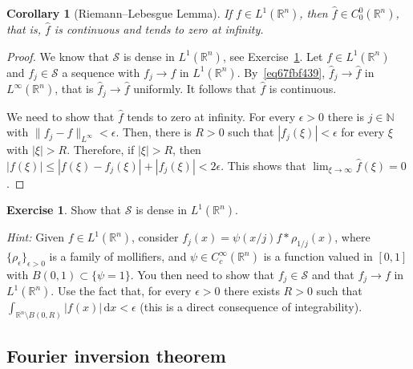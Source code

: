 \documentclass[a4paper,9pt]{amsart}
\newcommand{\scr}[1]{\mathscr{#1}}
\newcommand{\N}{\mathbb{N}}	%
\newcommand{\R}{\mathbb{R}}	%
\newcommand{\did}{\,\mathrm{d}}	%
\theoremstyle{plain}
\newtheorem{corollary}[proposition]{Corollary}
\theoremstyle{definition}
\newtheorem{exercise}[proposition]{Exercise}%
\theoremstyle{remark}
\begin{document}
\begin{corollary}[Riemann--Lebesgue Lemma]
	If $f\in L^1(\R^n)$, then $\hat f\in C^0_0(\R^n)$, that is, $\hat f$ is continuous and tends to zero at infinity.
\end{corollary}
\begin{proof}
	We know that $\scr S$ is dense in $L^1(\R^n)$, see Exercise~\ref{ex67fbf2c0}.
	Let $f\in L^1(\R^n)$ and $f_j\in\scr S$ a sequence with $f_j\to f$ in $L^1(\R^n)$.
	By~\eqref{eq67fbf439}, $\hat f_j\to\hat f$ in $L^\infty(\R^n)$, that is $\hat f_j\to \hat f$ uniformly.
	It follows that $\hat f$ is continuous.
	
	We need to show that $\hat f$ tends to zero at infinity.
	For every $\epsilon>0$ there is $j\in\N$ with $\|f_j-f\|_{L^\infty}<\epsilon$.  
	Then, there is $R>0$ such that $|f_j(\xi)|<\epsilon$ for every $\xi$ with $|\xi|>R$.
	Therefore, if $|\xi|>R$, then $|f(\xi)| \le |f(\xi)-f_j(\xi)| + |f_j(\xi)| < 2\epsilon$.
	This shows that $\lim_{\xi\to\infty} \hat f(\xi) = 0$.
\end{proof}

\begin{exercise}\label{ex67fbf2c0}
	Show that $\scr S$ is dense in $L^1(\R^n)$.
	
	{\it Hint:} 
	Given $f\in L^1(\R^n)$, consider $f_j(x) = \psi(x/j) f*\rho_{1/j}(x)$,
	where $\{\rho_\epsilon\}_{\epsilon>0}$ is a family of mollifiers, and $\psi\in C^\infty_c(\R^n)$ is a function valued in $[0,1]$ with $B(0,1) \subset\{\psi =1\}$.
	You then need to show that $f_j\in\scr S$ and that $f_j\to f$ in $L^1(\R^n)$.
	Use the fact that, for every $\epsilon>0$ there exists $R>0$ such that $\int_{\R^n\setminus B(0,R)} |f(x)| \did x < \epsilon$ (this is a direct consequence of integrability).
\end{exercise}

\subsection{Fourier inversion theorem}
\end{document}
